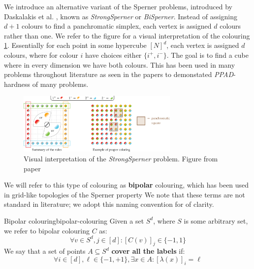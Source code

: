 We introduce an alternative variant of the Sperner problems,
introduced by Daskalakis et al. \cite{daskalakis_ComplexityConstrainedMinmax_2021}, known as \textit{StrongSperner} or \textit{BiSperner}.
Instead of assigning
$d+1$ colours to find a panchromatic simplex, each vertex is assigned $d$ colours rather than one. We refer to the figure
for a visual interpretation of the colouring \ref{fig:chap-2:bisperner-example}. Essentially for each point
in some hypercube $[N]^d$, each vertex is assigned $d$ colours, where for colour $i$ have choices
either $\{i^+, i^-\}$. The goal is to find a cube where in every dimension we have both colours.
This has been used in many problems throughout
literature as seen in the papers \cite{chen_SettlingComplexityComputing_2009, deligkas_PureCircuitTightInapproximability_2024, daskalakis_ComplexityConstrainedMinmax_2021}
to demonstated \textit{PPAD}-hardness of many problems.

\begin{figure}
    \centering
    \includegraphics[width=0.7\textwidth]{Chapter2/2DBiSperner.png}
    \caption{Visual interpretation of the \textit{StrongSperner} problem. Figure from paper \cite{daskalakis_ComplexityConstrainedMinMax_2020}}
    \label{fig:chap-2:bisperner-example}
\end{figure}

We will refer to this type of colouring as \textbf{bipolar} colouring, which has been used in grid-like topologies of the Sperner property
We note that these terms are not standard in literature; we adopt this naming convention
for of clarity.

\begin{definitionbox}{Bipolar colouring}{bipolar-colouring}
    Given a set $S^d$, where $S$ is some arbitrary set, we refer
    to bipolar colouring $C$ as:
    $$
        \forall v \in S^d, j \in [d]: [C(v)]_j \in \{-1,1\}
    $$
    We say that a set of points $A \subseteq S^d$ \textbf{cover all the labels} if:
    $$
        \forall i \in [d], \ell \in \{-1, +1\}, \exists x \in A: [\lambda(x)]_{i} = \ell
    $$
\end{definitionbox}

